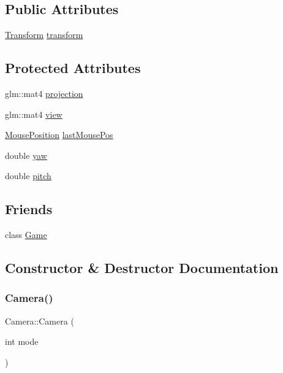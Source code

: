 \subsection*{Public Attributes}
\begin{DoxyCompactItemize}
\item 
\mbox{\hyperlink{class_transform}{Transform}} \mbox{\hyperlink{class_camera_ad5cea63239e1519c1fe7d414f5e047a8}{transform}}
\end{DoxyCompactItemize}
\subsection*{Protected Attributes}
\begin{DoxyCompactItemize}
\item 
glm\+::mat4 \mbox{\hyperlink{class_camera_a43555a0ae83f9ec696ee257e5fd48cf2}{projection}}
\item 
glm\+::mat4 \mbox{\hyperlink{class_camera_add93fedd6b9a6a6e2c784aeda624de83}{view}}
\item 
\mbox{\hyperlink{struct_mouse_position}{Mouse\+Position}} \mbox{\hyperlink{class_camera_a452e0aabdcd36e235c2f8705b736482c}{last\+Mouse\+Pos}}
\item 
double \mbox{\hyperlink{class_camera_a54536224732656e8f4a419cf11662d3e}{yaw}}
\item 
double \mbox{\hyperlink{class_camera_a481e669a6f96826929e323706543a6a4}{pitch}}
\end{DoxyCompactItemize}
\subsection*{Friends}
\begin{DoxyCompactItemize}
\item 
class \mbox{\hyperlink{class_camera_aa2fab026580d6f14280c2ffb8063a314}{Game}}
\end{DoxyCompactItemize}


\subsection{Constructor \& Destructor Documentation}
\mbox{\label{class_camera_a706e41a11eee92cd3f597386ae860885}} 
\subsubsection{\texorpdfstring{Camera()}{Camera()}\hspace{0.1cm}{\footnotesize\ttfamily [1/2]}}
{\footnotesize\ttfamily Camera\+::\+Camera (\begin{DoxyParamCaption}\item[{int}]{mode }\end{DoxyParamCaption})}

